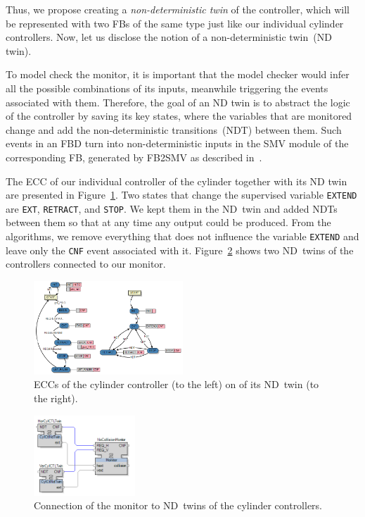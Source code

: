 \documentclass[conference]{IEEEtran}
\begin{document}
Thus, we propose creating a \emph{non-deterministic twin} of the controller, which will be represented with two FBs of the same type just like our individual cylinder controllers. Now, let us disclose the notion of a non-deterministic twin~(ND twin). 

To model check the monitor, it is important that the model checker would infer all the possible combinations of its inputs, meanwhile triggering the events associated with them. Therefore, the goal of an ND twin is to abstract the logic of the controller by saving its key states, where the variables that are monitored change and add the non-deterministic transitions~(NDT) between them. Such events in an FBD turn into non-deterministic inputs in the SMV module of the corresponding FB, generated by FB2SMV as described in~\cite{agn_case_study}. 

The ECC of our individual controller of the cylinder together with its ND twin are presented in Figure~\ref{fig:ndtwinecc}. Two states that change the supervised variable \texttt{EXTEND} are \texttt{EXT}, \texttt{RETRACT}, and \texttt{STOP}. We kept them in the ND~twin and added NDTs between them so that at any time any output could be produced. From the algorithms, we remove everything that does not influence the variable \texttt{EXTEND} and leave only the \texttt{CNF} event associated with it. Figure~\ref{fig:ndtwinloop} shows two ND~twins of the controllers connected to our monitor.

\begin{figure}[t]
    \centering
    \includegraphics[width=0.5\textwidth]{pic/ndtcontrollereccs.png}
    \caption{ECCs of the cylinder controller (to the left) on of its ND~twin (to the right).}
    \label{fig:ndtwinecc}
\end{figure}


\begin{figure}[b]
    \centering
    \includegraphics[width=0.34\textwidth]{pic/ndtwinloop.png}
    \caption{Connection of the monitor to ND~twins of the cylinder controllers.}
    \label{fig:ndtwinloop}
\end{figure}
\end{document}
